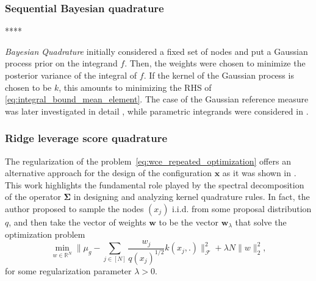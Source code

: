 \documentclass[twoside,11pt]{book}
\numberwithin{theorem}{chapter}
\numberwithin{definition}{chapter}
\numberwithin{proposition}{chapter}
\numberwithin{corollary}{chapter}
\numberwithin{example}{chapter}
\numberwithin{lemma}{chapter}
\begin{document}
\subsubsection{Sequential Bayesian quadrature}

****

\emph{Bayesian Quadrature} \citep{Lar72} initially considered a fixed set of nodes and put a Gaussian process prior on the integrand $f$. Then, the weights were chosen to minimize the posterior variance of the integral of $f$. If the kernel of the Gaussian process is chosen to be $k$, this amounts to minimizing the RHS of \eqref{eq:integral_bound_mean_element}. The case of the Gaussian reference measure was later investigated in detail \citep{Hag91}, while parametric integrands were considered in \citep{Min00}.

\subsubsection{Ridge leverage score quadrature}
\label{subsec:okq_algebraic_paradigm}
The regularization of the problem~\eqref{eq:wce_repeated_optimization} offers an alternative approach for the design of the configuration $\bm{x}$ as it was shown in \citep{Bac17}.
This work highlights the fundamental role played by the spectral decomposition of the operator $\bm{\Sigma}$ in designing and analyzing kernel quadrature rules.
In fact, the author proposed to sample the nodes $(x_j)$ i.i.d. from some proposal distribution $q$, and then take the vector of weights $\bm{w}$ to be the vector $\bm{w}_{\lambda}$ that solve the optimization problem
\begin{equation}\label{eq:reg_kernel_opt_problem}
\min\limits_{w \in \mathbb{R}^{N}} \Big\| \mu_{g} - \sum\limits_{j \in [N]} \frac{w_{j}}{q(x_{j})^{1/2}} k(x_{j},.) \Big\|_{\mathcal{F}}^{2} + \lambda N \|w\|_{2}^{2},
\end{equation}
for some regularization parameter $\lambda>0$. 

\end{document}
